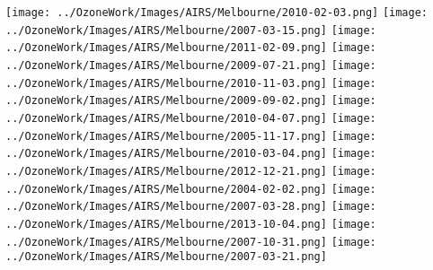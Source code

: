   \texttt{[image: ../OzoneWork/Images/AIRS/Melbourne/2010-02-03.png]}
  \texttt{[image: ../OzoneWork/Images/AIRS/Melbourne/2007-03-15.png]}
  \texttt{[image: ../OzoneWork/Images/AIRS/Melbourne/2011-02-09.png]}
  \texttt{[image: ../OzoneWork/Images/AIRS/Melbourne/2009-07-21.png]}
  \texttt{[image: ../OzoneWork/Images/AIRS/Melbourne/2010-11-03.png]}
  \texttt{[image: ../OzoneWork/Images/AIRS/Melbourne/2009-09-02.png]}
  \texttt{[image: ../OzoneWork/Images/AIRS/Melbourne/2010-04-07.png]}
  \texttt{[image: ../OzoneWork/Images/AIRS/Melbourne/2005-11-17.png]}
  \texttt{[image: ../OzoneWork/Images/AIRS/Melbourne/2010-03-04.png]}
  \texttt{[image: ../OzoneWork/Images/AIRS/Melbourne/2012-12-21.png]}
  \texttt{[image: ../OzoneWork/Images/AIRS/Melbourne/2004-02-02.png]}
  \texttt{[image: ../OzoneWork/Images/AIRS/Melbourne/2007-03-28.png]}
  \texttt{[image: ../OzoneWork/Images/AIRS/Melbourne/2013-10-04.png]}
  \texttt{[image: ../OzoneWork/Images/AIRS/Melbourne/2007-10-31.png]}
  \texttt{[image: ../OzoneWork/Images/AIRS/Melbourne/2007-03-21.png]}
